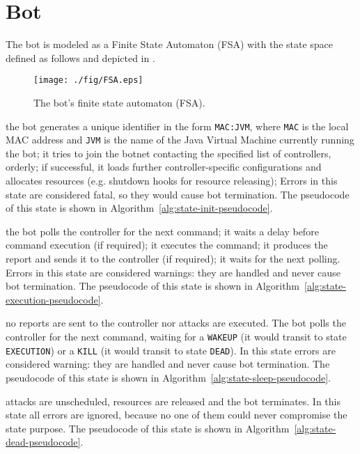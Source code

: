 \section{Bot}
\label{sec:bot}

The bot is modeled as a Finite State Automaton (FSA) with the state space defined as follows and depicted in .

\begin{figure}[tp]
  \centering
  \texttt{[image: ./fig/FSA.eps]}
  \caption{The bot's finite state automaton (FSA).}
    \label{fig:bot-fsa}
\end{figure}

\begin{description}
  \setlength\itemsep{1em}

  \item[INIT] the bot generates a unique identifier in the form \texttt{MAC:JVM}, where \texttt{MAC} is the local MAC address and \texttt{JVM} is the name of the Java Virtual Machine currently running the bot; it tries to join the botnet contacting the specified list of controllers, orderly; if successful, it loads further controller-specific configurations and allocates resources (e.g. shutdown hooks for resource releasing);
  Errors in this state are considered fatal, so they would cause bot termination. The pseudocode of this state is shown in Algorithm~\ref{alg:state-init-pseudocode}.

  \item[EXECUTION] the bot polls the controller for the next command; it waits a delay before command execution (if required); it executes the command; it produces the report and sends it to the controller (if required); it waits for the next polling.
  Errors in this state are considered warnings: they are handled and never cause bot termination. The pseudocode of this state is shown in Algorithm~\ref{alg:state-execution-pseudocode}.

  \item[SLEEP] no reports are sent to the controller nor attacks are executed. The bot polls the controller for the next command, waiting for a \texttt{WAKEUP} (it would transit to state \texttt{EXECUTION}) or a \texttt{KILL} (it would transit to state \texttt{DEAD}).
  In this state errors are considered warning: they are handled and never cause bot termination. The pseudocode of this state is shown in Algorithm~\ref{alg:state-sleep-pseudocode}.


  \item[DEAD] attacks are unscheduled, resources are released and the bot terminates. In this state all errors are ignored, because no one of them could never compromise the state purpose. The pseudocode of this state is shown in Algorithm~\ref{alg:state-dead-pseudocode}.

\end{description}

